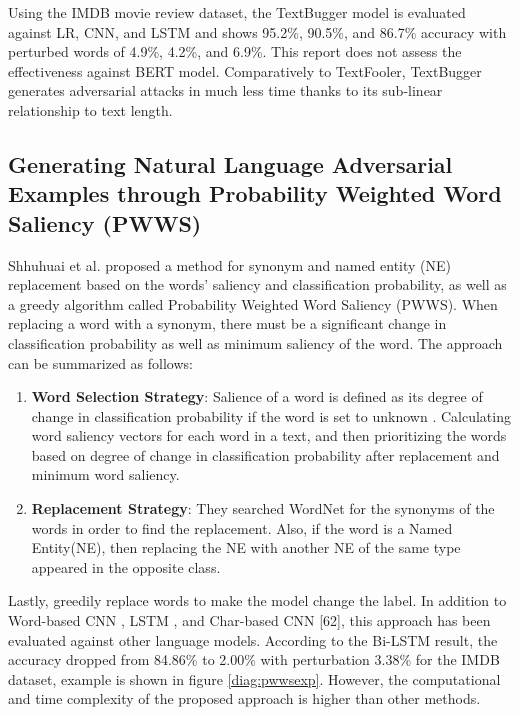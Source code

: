 \documentclass[%
	BCOR=8mm, %
	DIV=12,
	toc=bibliography, %
	toc=listof, %
	oneside, %
	egregdoesnotlikesansseriftitles, %
	]{scrbook}
\begin{document}
Using the IMDB movie review dataset, the TextBugger model is evaluated against LR, CNN, and LSTM and shows 95.2\%, 90.5\%, and 86.7\% accuracy with perturbed words of 4.9\%, 4.2\%, and 6.9\%. This report does not assess the effectiveness against BERT model. Comparatively to TextFooler, TextBugger generates adversarial attacks in much less time thanks to its sub-linear relationship to text length.

\subsection{Generating Natural Language Adversarial Examples through Probability Weighted Word Saliency (PWWS)}
\label{subsection:generatingadversarialexample}
Shhuhuai et al. \cite{ren_generating_2019} proposed a method for synonym and named entity (NE) replacement based on the words' saliency and classification probability, as well as a greedy algorithm called Probability Weighted Word Saliency (PWWS). When replacing a word with a synonym, there must be a significant change in classification probability as well as minimum saliency of the word. The approach can be summarized as follows:

\begin{enumerate}
    \item \textbf{Word Selection Strategy}:  
   Salience of a word is defined as its degree of change in classification probability if the word is set to unknown \cite{li_understanding_2017}. Calculating word saliency vectors for each word in a text, and then prioritizing the words based on degree of change in classification probability after replacement and minimum word saliency.
    \item \textbf{Replacement Strategy}: They searched WordNet for the synonyms of the words in order to find the replacement. Also, if the word is a Named Entity(NE), then replacing the NE with another NE of the same type appeared in the opposite class.
\end{enumerate}
Lastly, greedily replace words to make the model change the label. In addition to Word-based CNN \cite{kim_convolutional_2014},  LSTM \cite{hochreiter_long_1997},  and Char-based CNN [62], this approach has been evaluated against other language models. According to the Bi-LSTM result, the accuracy dropped from 84.86\% to 2.00\% with perturbation 3.38\% for the IMDB dataset, example is shown in figure \ref{diag:pwwsexp}. However, the computational and time complexity of the proposed approach is higher than other methods.
\end{document}
